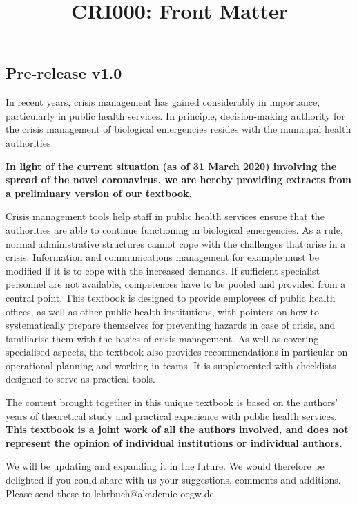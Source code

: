 \documentclass{article}
\begin{document}
\title{CRI000: Front Matter}

\maketitle


\subsection{Pre-release v1.0}\label{H6627615}



In recent years, crisis management has gained considerably in importance, particularly in public health services. In principle, decision-making authority for the crisis management of biological emergencies resides with the municipal health authorities.


\textbf{In light of the current situation (as of 31 March 2020) involving the spread of the novel coronavirus, we are hereby providing extracts from a preliminary version of our textbook.}


Crisis management tools help staff in public health services ensure that the authorities are able to continue functioning in biological emergencies. As a rule, normal administrative structures cannot cope with the challenges that arise in a crisis. Information and communications management for example must be modified if it is to cope with the increased demands. If sufficient specialist personnel are not available, competences have to be pooled and provided from a central point. This textbook is designed to provide employees of public health offices, as well as other public health institutions, with pointers on how to systematically prepare themselves for preventing hazards in case of crisis, and familiarise them with the basics of crisis management. As well as covering specialised aspects, the textbook also provides recommendations in particular on operational planning and working in teams. It is supplemented with checklists designed to serve as practical tools.


The content brought together in this unique textbook is based on the authors' years of theoretical study and practical experience with public health services. \textbf{This textbook is a joint work of all the authors involved, and does not represent the opinion of individual institutions or individual authors.}


We will be updating and expanding it in the future. We would therefore be delighted if you could share with us your suggestions, comments and additions. Please send these to lehrbuch@akademie-oegw.de.
\end{document}

